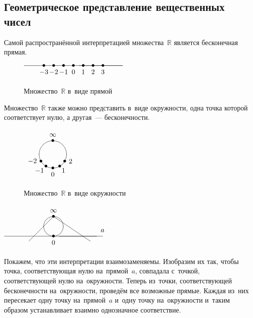 \subsection{Геометрическое представление вещественных чисел}
Самой распространённой интерпретацией множества~$\mathbb R$ является бесконечная прямая.
\begin{figure}[h] \centering
\noindent
$\begin{xy} /r5mm/:
(0, 0) *{\bullet} *++!U{0};
(5, 0) **@{-};
(-5, 0) **@{-};
(1, 0) *{\bullet} *++!U{1};
(2, 0) *{\bullet} *++!U{2};
(3, 0) *{\bullet} *++!U{3};
(-1, 0) *{\bullet} *++!U{-1};
(-2, 0) *{\bullet} *++!U{-2};
(-3, 0) *{\bullet} *++!U{-3};
\end{xy}$
\caption{Множество~$\mathbb R$ в~виде прямой}
\end{figure}

Множество~$\mathbb R$ также можно представить в~виде окружности, одна точка которой соответствует нулю, а другая~--- бесконечности.
\begin{figure}[h] \centering
\noindent
$\begin{xy} /r7mm/:
(0, 0) *\cir<7mm>{};
(-0.8660, -0.5) *{\bullet} *++!R{-2};
(-0.5, -0.8660) *{\bullet} *+!UR{-1};
(0, -1) *{\bullet} *++!U{0};
(0.5, -0.8660) *{\bullet} *+!UL{1};
(0.8660, -0.5) *{\bullet} *++!L{2};
(0, 1) *{\bullet} *++!D{\infty};
\end{xy}$
\caption{Множество~$\mathbb R$ в~виде окружности}
\end{figure}

\begin{floatingfigure}[r]{54mm}
\noindent
$\begin{xy} /r5mm/:
(0, 0) *{\bullet} *++!U{0};
(5, 0) **@{-} *++!D{a};
(-5, 0) **@{-};
(0, 1) *\cir<5mm>{};
(0, 2) = "inf" *{\bullet} *++!D{\infty};
(3.75, -0.5) **@{-};
"inf"; (-2.5, -0.5) **@{-};
\end{xy}$
\end{floatingfigure}
Покажем, что эти интерпретации взаимозаменяемы.
Изобразим их так, чтобы точка, соответствующая нулю на~прямой~$a$, совпадала с~точкой, соответствующей нулю на~окружности.
Теперь из~точки, соответствующей бесконечности на~окружности, проведём все возможные прямые.
Каждая из~них пересекает одну точку на~прямой~$a$ и~одну точку на~окружности и~таким образом устанавливает взаимно однозначное соответствие.
